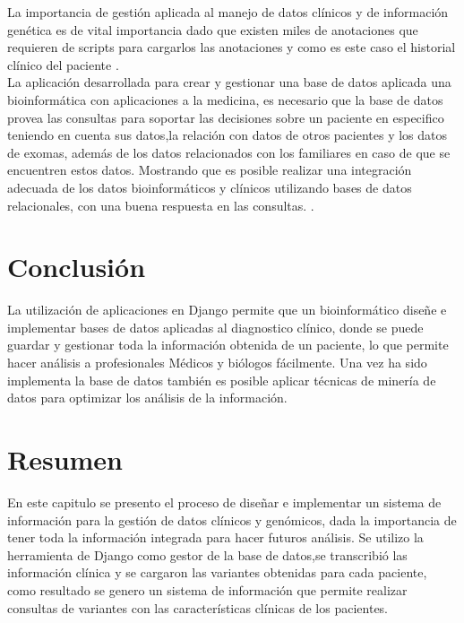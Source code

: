 La importancia de gestión aplicada al manejo de datos clínicos y de información genética es de vital importancia dado que existen miles de anotaciones que requieren de scripts para cargarlos las anotaciones y como es este caso el historial clínico del paciente \cite{Paila2013}. \\

La aplicación desarrollada para crear y gestionar una base de datos aplicada una bioinformática con aplicaciones a la medicina, es necesario que la base de datos provea las consultas para soportar las decisiones sobre un paciente en especifico teniendo en cuenta sus datos,la relación con datos de otros pacientes y los datos de exomas, además de los datos relacionados con los familiares en caso de que se encuentren estos datos. Mostrando que es posible realizar una integración adecuada de los datos bioinformáticos y clínicos utilizando bases de datos relacionales, con una buena respuesta en las consultas. \cite{Sujansky2001}.

\section{Conclusión}

La utilización de aplicaciones en Django permite que un bioinformático diseñe e implementar bases de datos aplicadas al diagnostico clínico, donde se puede guardar y gestionar toda la información obtenida de un paciente, lo que permite hacer análisis a profesionales Médicos y biólogos fácilmente. Una vez ha sido implementa la base de datos también es posible aplicar técnicas de minería de datos para optimizar los análisis de la información. \\

\section*{Resumen}

En este capitulo se presento el proceso de diseñar e implementar un sistema de información para la gestión de datos clínicos y genómicos, dada la importancia de tener toda la información integrada para hacer futuros análisis. Se utilizo la herramienta de Django como gestor de la base de datos,se transcribió las información clínica y se cargaron las variantes obtenidas para cada paciente, como resultado se genero un sistema de información que permite realizar consultas de variantes con las características clínicas de los pacientes.   